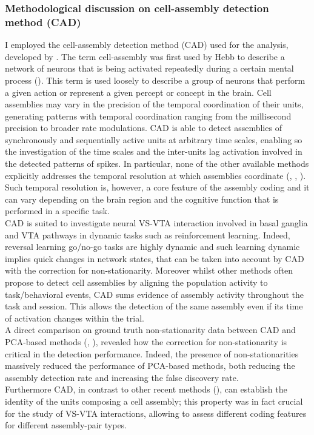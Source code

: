 \subsubsection{Methodological discussion on cell-assembly detection method (CAD)}
I employed the cell-assembly detection method (CAD) used for the analysis, developed by . The term cell-assembly was first used by Hebb to describe a network of neurons that is being activated repeatedly during a certain mental process (\cite{Hebb}). This term is used loosely to describe a group of neurons that perform a given action or represent a given percept or concept in the brain. Cell assemblies may vary in the precision of  the temporal coordination of their units, generating patterns with  temporal coordination ranging from  the  millisecond precision to broader rate modulations. CAD is able to detect assemblies of synchronously and sequentially active units at arbitrary time scales, enabling so the investigation of the time scales and the inter-units lag activation involved in the detected patterns of spikes. In particular, none of the other available methods explicitly addresses the temporal resolution at which assemblies coordinate (\cite{Gruen}, \cite{Tavoni}, \cite{Billeh}). Such temporal resolution is, however, a core feature of the assembly coding and it can vary depending on the brain region and the cognitive function that is performed in a specific task.\\CAD is suited to investigate neural VS-VTA interaction involved in basal ganglia and VTA pathways in dynamic tasks such as reinforcement learning. Indeed, reversal learning go/no-go tasks are highly dynamic and such learning dynamic implies quick changes in network states, that can be taken into account by CAD with the correction for non-stationarity. Moreover whilst other methods often propose to detect cell assemblies by aligning the population activity to task/behavioral events, CAD sums evidence of assembly activity throughout the task and session. This allows the detection of the same assembly even if its time of activation changes within the trial.\\A direct comparison on ground truth non-stationarity data between CAD and PCA-based methods (\cite{Lopes}, \cite{RussoDurstewitz}), revealed how the correction for non-stationarity is critical in the detection performance. Indeed, the presence of non-stationarities massively reduced the performance of PCA-based methods, both reducing the assembly detection rate and increasing the false discovery rate.\\Furthermore CAD, in contrast to other recent methods (\cite{Watanabe2019}), can establish the identity of the units composing a cell assembly; this property was in fact crucial for the study of VS-VTA interactions, allowing to assess different coding features for different assembly-pair types.
